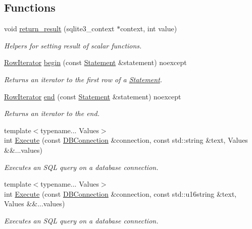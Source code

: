 \subsection*{Functions}
\begin{DoxyCompactItemize}
\item 
\hypertarget{a00038_a360b699b9321d7364777d056ef0d90b1}{void \hyperlink{a00038_a360b699b9321d7364777d056ef0d90b1}{return\-\_\-result} (sqlite3\-\_\-context $\ast$context, int value)}\label{a00038_a360b699b9321d7364777d056ef0d90b1}

\begin{DoxyCompactList}\small\item\em Helpers for setting result of scalar functions. \end{DoxyCompactList}\item 
\hyperlink{a00012}{Row\-Iterator} \hyperlink{a00038_a2ede4bc12dfc7f616c6519be580a00b8}{begin} (const \hyperlink{a00013}{Statement} \&statement) noexcept
\begin{DoxyCompactList}\small\item\em Returns an iterator to the first row of a \hyperlink{a00013}{Statement}. \end{DoxyCompactList}\item 
\hyperlink{a00012}{Row\-Iterator} \hyperlink{a00038_a81414d1114232fd69009360999cb7d49}{end} (const \hyperlink{a00013}{Statement} \&statement) noexcept
\begin{DoxyCompactList}\small\item\em Returns an iterator to the end. \end{DoxyCompactList}\item 
{\footnotesize template$<$typename... Values$>$ }\\int \hyperlink{a00038_a2e59fc3438649aa88998d2c18c574b17}{Execute} (const \hyperlink{a00004}{D\-B\-Connection} \&connection, const std\-::string \&text, Values \&\&...values)
\begin{DoxyCompactList}\small\item\em Executes an S\-Q\-L query on a database connection. \end{DoxyCompactList}\item 
{\footnotesize template$<$typename... Values$>$ }\\int \hyperlink{a00038_a422d5b6ac99e4ed57f69fdc8a4cb904d}{Execute} (const \hyperlink{a00004}{D\-B\-Connection} \&connection, const std\-::u16string \&text, Values \&\&...values)
\begin{DoxyCompactList}\small\item\em Executes an S\-Q\-L query on a database connection. \end{DoxyCompactList}\end{DoxyCompactItemize}


